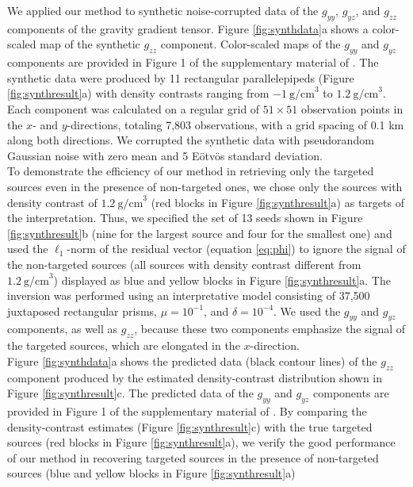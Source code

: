 We applied our method to synthetic
noise-corrupted data of the $g_{yy}$, $g_{yz}$, and $g_{zz}$ components
of the gravity gradient tensor.
Figure \ref{fig:synthdata}a shows a color-scaled map of the synthetic
$g_{zz}$ component.
Color-scaled maps of the $g_{yy}$ and $g_{yz}$ components
are provided in Figure 1 of
the supplementary material of \citet{Uieda2012b}.
The synthetic data were produced by 11 rectangular parallelepipeds (Figure
\ref{fig:synthresult}a) with density contrasts ranging from
$-1\ \mathrm{g/cm}^3$ to $1.2\ \mathrm{g/cm}^3$.
Each component was calculated on a regular grid of $51 \times 51$ observation
points in the $x$- and $y$-directions, totaling 7,803 observations, with a grid
spacing of 0.1 km along both directions.
We corrupted the synthetic data with pseudorandom Gaussian noise with zero mean
and 5 E\"otv\"os standard deviation.
\\ \indent
To demonstrate the efficiency of our method in retrieving only the targeted
sources even in the presence of non-targeted ones, we chose only the sources
with density contrast of $1.2\ \mathrm{g/cm}^3$ (red blocks in Figure
\ref{fig:synthresult}a) as targets of the interpretation.
Thus, we specified the set of 13 seeds shown in Figure
\ref{fig:synthresult}b (nine for the largest
source and four for the smallest one) and used the $\ell_1$-norm of the residual
vector (equation \ref{eq:phi}) to ignore the signal of the non-targeted
sources (all sources with density contrast different from
$1.2\ \mathrm{g/cm}^3$) displayed as blue and yellow blocks in Figure
\ref{fig:synthresult}a.
The inversion was performed using an interpretative model consisting of 37,500
juxtaposed rectangular prisms, $\mu=10^{-1}$, and $\delta = 10^{-4}$.
We used the $g_{yy}$ and $g_{yz}$ components, as well as $g_{zz}$, because
these two components emphasize
the signal of the targeted sources, which are
elongated in the $x$-direction.
\\ \indent
Figure \ref{fig:synthdata}a shows the predicted data
(black contour lines)
of the $g_{zz}$ component
produced by the estimated density-contrast distribution
shown in Figure \ref{fig:synthresult}c.
The predicted data of the $g_{yy}$ and $g_{yz}$ components
are provided in Figure 1 of
the supplementary material of \citet{Uieda2012b}.
By comparing the density-contrast estimates (Figure
\ref{fig:synthresult}c) with the true targeted
sources (red blocks in Figure \ref{fig:synthresult}a),
we verify the good performance of our method
in recovering targeted sources in the presence of non-targeted sources
(blue and yellow blocks in Figure \ref{fig:synthresult}a)
